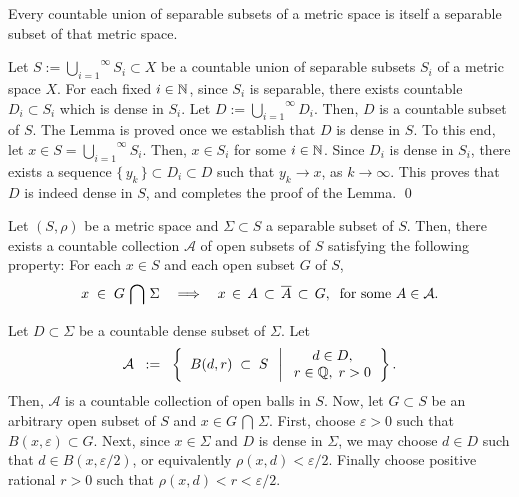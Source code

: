 \vskip 0.6cm
\begin{lemma}\label{lemma:CountableUnionsOfSeparablesAreSeparable}
\mbox{}
\vskip 0.3cm
\noindent
Every countable union of separable subsets of a metric space is itself a separable subset of that metric space.
\end{lemma}
\proof
Let $S := \overset{\infty}{\underset{i=1}{\bigcup}}S_{i} \subset X$ be a countable union
of separable subsets $S_{i}$ of a metric space $X$.
For each fixed $i \in \mathbb{N}$,
since $S_{i}$ is separable, there exists countable $D_{i} \subset S_{i}$ which is dense in $S_{i}$.
Let $D := \overset{\infty}{\underset{i=1}{\bigcup}}D_{i}$.
Then, $D$ is a countable subset of $S$.
The Lemma is proved once we establish that $D$ is dense in $S$.
To this end, let $x \in S = \overset{\infty}{\underset{i=1}{\bigcup}}S_{i}$.
Then, $x \in S_{i}$ for some $i \in \mathbb{N}$.
Since $D_{i}$ is dense in $S_{i}$, there exists a sequence
$\{\,y_{k}\,\} \subset D_{i} \subset D$ such that $y_{k} \longrightarrow x$, as $k \longrightarrow \infty$.
This proves that $D$ is indeed dense in $S$, and completes the proof of the Lemma.
\qed

\vskip 0.6cm
\begin{lemma}
\label{lemma:ExistenceOfScriptA}
\mbox{}
\vskip 0.3cm
\noindent
Let $(S,\rho)$ be a metric space and $\Sigma \subset S$ a separable subset of $S$.
Then, there exists a countable collection $\mathcal{A}$ of open subsets of $S$ satisfying the following property:
For each $x \in S$ and each open subset $G$ of $S$,
\begin{equation*}
x \; \in \; G\,\bigcap\,\Sigma
\quad
\Longrightarrow
\quad
x \,\in\, A \,\subset\, \overline{A} \,\subset\, G,
\;\;\textnormal{for some $A \in \mathcal{A}$}.
\end{equation*} 
\end{lemma}
\proof
Let $D \subset \Sigma$ be a countable dense subset of $\Sigma$.
Let
\begin{equation*}
\mathcal{A}
\;\; := \;\;
\left\{\;\;
B(d,r) \;\subset\; S
\;\;\left\vert\;
\begin{array}{c} d \in D, \\ r \in \mathbb{Q}, \; r > 0 \end{array}
\right.
\right\}.
\end{equation*}
Then, $\mathcal{A}$ is a countable collection of open balls in $S$.
Now, let $G \subset S$ be an arbitrary open subset of $S$ and $x \in G \,\bigcap\, \Sigma$.
First, choose $\varepsilon > 0$ such that $B(x,\varepsilon) \subset G$.
Next, since $x \in \Sigma$ and $D$ is dense in $\Sigma$,
we may choose $d \in D$ such that $d \in B(x,\varepsilon/2)$, or equivalently $\rho(x,d) < \varepsilon / 2$.
Finally choose positive rational $r > 0$ such that $\rho(x,d) < r < \varepsilon / 2$.

